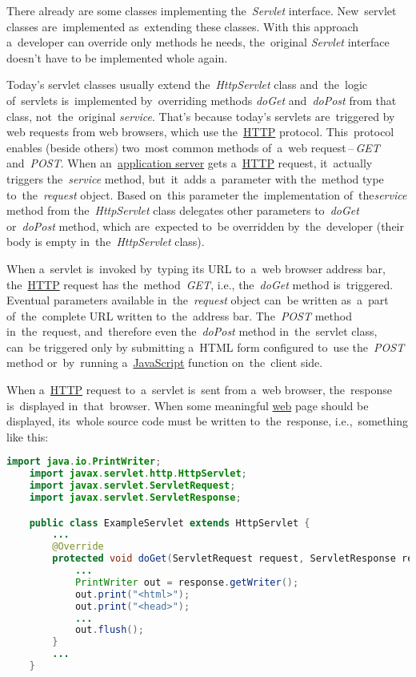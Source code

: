 There already are some classes implementing the~\textit{Servlet} interface. New~servlet classes are~implemented as~extending these classes. With this approach a~developer can override only methods he needs, the~original \textit{Servlet} interface doesn't have to be implemented whole again.

 Today's servlet classes usually extend the~\textit{HttpServlet} class and~the~logic of~servlets is~implemented by~overriding methods \textit{doGet} and~\textit{doPost} from that class, not~the~original \textit{service}. That's because today's servlets are~triggered by web requests from web browsers, which use the~\hyperref[http]{HTTP} protocol. This~protocol enables (beside others) two~most common methods of~a~web request\,--\,\textit{GET} and~\textit{POST}. When an~\hyperref[applicationserver]{application server} gets a~\hyperref[http]{HTTP} request, it~actually triggers the~\textit{service} method, but~it~adds a~parameter with the~method type to~the~\textit{request} object. Based on~this parameter the~implementation of~the\textit{service} method from the~\textit{HttpServlet} class delegates other parameters to~\textit{doGet} or~\textit{doPost} method, which are~expected to~be overridden by~the~developer (their body is empty in~the~\textit{HttpServlet} class).

When a~servlet is~invoked by~typing its URL to~a~web browser address bar, the~\hyperref[http]{HTTP} request has the~method~\textit{GET}, i.e., the~\textit{doGet} method is~triggered. Eventual parameters available in~the~\textit{request} object can~be written as~a~part of~the~complete URL written to~the~address bar. The~\textit{POST} method in~the~request, and~therefore even the~\textit{doPost} method in~the~servlet class, can~be triggered only by submitting a~HTML form configured to~use the~\textit{POST} method or~by~running a~\hyperref[javascript]{JavaScript} function on~the~client side.


\label{jsp}
When a~\hyperref[http]{HTTP} request to~a~servlet is~sent from a~web browser, the~response is~displayed in~that~browser. When some meaningful \hyperref[internetweb]{web} page should be displayed, its~whole source code must be written to~the~response, i.e.,~something like this:

\begin{lstlisting}[language=Java]
    import java.io.PrintWriter;
    import javax.servlet.http.HttpServlet;
    import javax.servlet.ServletRequest;
    import javax.servlet.ServletResponse;

    public class ExampleServlet extends HttpServlet {
        ...
        @Override
        protected void doGet(ServletRequest request, ServletResponse response) {
            ...
            PrintWriter out = response.getWriter();
            out.print("<html>");
            out.print("<head>");
            ...
            out.flush();
        }
        ...
    }
\end{lstlisting}

